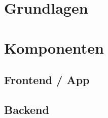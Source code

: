 \documentclass[a4paper, 11pt, DIV=11, listof=numbered, numbers=noenddot]{scrartcl}
\begin{document}
	\section{Grundlagen}
	\blindtext

	\section{Komponenten}
	\blindtext

	\subsection{Frontend / App}
	\blindtext

	\subsection{Backend}
	\blindtext
	                     
	\printbibliography
\end{document}
